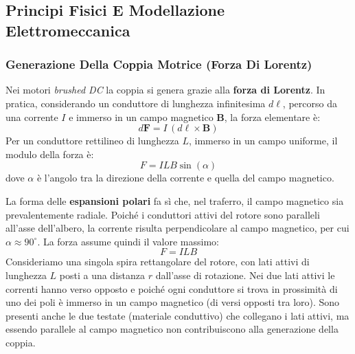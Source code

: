 ﻿\documentclass[11pt, a4paper]{article}
\begin{document}
\subsection{Principi Fisici E Modellazione Elettromeccanica}

\subsubsection{Generazione Della Coppia Motrice (Forza Di Lorentz)}
Nei motori \textit{brushed DC} la coppia si genera grazie alla \textbf{forza di Lorentz}. In pratica, considerando un conduttore di lunghezza infinitesima \(d\bm{\ell}\), percorso da una corrente \(I\) e immerso in un campo magnetico \(\bm{B}\), la forza elementare è:
\[
    d\bm{F} = I \, (d\bm{\ell} \times \bm{B})
\]
Per un conduttore rettilineo di lunghezza \(L\), immerso in un campo uniforme, il modulo della forza è:
\[
    F = I L B \sin(\alpha)
\]
dove \(\alpha\) è l'angolo tra la direzione della corrente e quella del campo magnetico.

La forma delle \textbf{espansioni polari} fa sì che, nel traferro, il campo magnetico sia prevalentemente radiale. Poiché i conduttori attivi del rotore sono paralleli all'asse dell'albero, la corrente risulta perpendicolare al campo magnetico, per cui \(\alpha \approx 90^\circ\). La forza assume quindi il valore massimo:
\[
    F = I L B
\]
Consideriamo una singola spira rettangolare del rotore, con lati attivi di lunghezza \(L\) posti a una distanza \(r\) dall'asse di rotazione. Nei due lati attivi le correnti hanno verso opposto e poiché ogni conduttore si trova in prossimità di uno dei poli è immerso in un campo magnetico (di versi opposti tra loro). Sono presenti anche le due testate (materiale conduttivo) che collegano i lati attivi, ma essendo parallele al campo magnetico non contribuiscono alla generazione della coppia.
\end{document}
